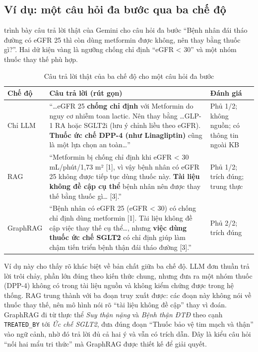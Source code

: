 \subsection{Ví dụ: một câu hỏi đa bước qua ba chế độ}

 trình bày câu trả lời thật của Gemini cho câu hỏi đa bước ``Bệnh nhân đái tháo đường có eGFR 25 thì còn dùng metformin được không, nên thay bằng thuốc gì?''. Hai dữ kiện vàng là ngưỡng chống chỉ định ``eGFR < 30'' và một nhóm thuốc thay thế phù hợp.

\begin{table}[H]
\centering
\caption{Câu trả lời thật của ba chế độ cho một câu hỏi đa bước}
\label{tab:ch5-example}
\small
\begin{tabularx}{\linewidth}{@{}L{1.9cm}YL{1.6cm}@{}}
\toprule
\textbf{Chế độ} & \textbf{Câu trả lời (rút gọn)} & \textbf{Đánh giá} \\
\midrule
Chỉ LLM & ``\ldots eGFR 25 \textbf{chống chỉ định} với Metformin do nguy cơ nhiễm toan lactic. Nên thay bằng \ldots GLP-1 RA hoặc SGLT2i (lưu ý chỉnh liều theo eGFR). \textbf{Thuốc ức chế DPP-4 (như Linagliptin)} cũng là một lựa chọn an toàn\ldots'' & Phủ 1/2; không nguồn; có thông tin ngoài KB \\
RAG & ``Metformin bị chống chỉ định khi eGFR < 30 mL/phút/1,73 m² [1], vì vậy bệnh nhân có eGFR 25 không được tiếp tục dùng thuốc này. \textbf{Tài liệu không đề cập cụ thể} bệnh nhân nên được thay thế bằng thuốc gì\ldots{} [3].'' & Phủ 1/2; trích đúng; trung thực \\
GraphRAG & ``Bệnh nhân có eGFR 25 (eGFR < 30) có chống chỉ định dùng metformin [1]. Tài liệu không đề cập việc thay thế cụ thể\ldots, nhưng \textbf{việc dùng thuốc ức chế SGLT2} có chỉ định giúp làm chậm tiến triển bệnh thận đái tháo đường [3].'' & Phủ 2/2; trích đúng \\
\bottomrule
\end{tabularx}
\end{table}

Ví dụ này cho thấy rõ khác biệt về bản chất giữa ba chế độ. LLM đơn thuần trả lời trôi chảy, phần lớn đúng theo kiến thức chung, nhưng đưa ra một nhóm thuốc (DPP-4) không có trong tài liệu nguồn và không kiểm chứng được trong hệ thống. RAG trung thành với ba đoạn truy xuất được: các đoạn này không nói về thuốc thay thế, nên mô hình nói rõ ``tài liệu không đề cập'' thay vì đoán. GraphRAG đi từ thực thể \emph{Suy thận nặng} và \emph{Bệnh thận ĐTĐ} theo cạnh \texttt{TREATED\_BY} tới \emph{Ức chế SGLT2}, đưa đúng đoạn ``Thuốc bảo vệ tim mạch và thận'' vào ngữ cảnh, nhờ đó trả lời đủ cả hai ý và vẫn có trích dẫn. Đây là kiểu câu hỏi ``nối hai mẩu tri thức'' mà GraphRAG được thiết kế để giải quyết.

